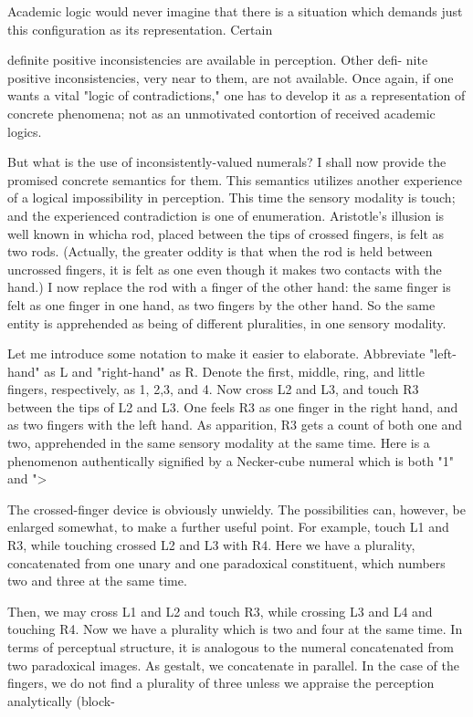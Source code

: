 Academic logic would never imagine that there is a situation 
which demands just this configuration as its representation. Certain 


definite positive inconsistencies are available in perception. Other defi- 
nite positive inconsistencies, very near to them, are not available. Once 
again, if one wants a vital "logic of contradictions," one has to develop 
it as a representation of concrete phenomena; not as an unmotivated 
contortion of received academic logics. 


But what is the use of inconsistently-valued numerals? I shall now 
provide the promised concrete semantics for them. This semantics 
utilizes another experience of a logical impossibility in perception. This 
time the sensory modality is touch; and the experienced contradiction 
is one of enumeration. Aristotle's illusion is well known in whicha rod, 
placed between the tips of crossed fingers, is felt as two rods. (Actually, 
the greater oddity is that when the rod is held between uncrossed 
fingers, it is felt as one even though it makes two contacts with the 
hand.) I now replace the rod with a finger of the other hand: the same 
finger is felt as one finger in one hand, as two fingers by the other hand. 
So the same entity is apprehended as being of different pluralities, in 
one sensory modality. 

Let me introduce some notation to make it easier to elaborate. 
Abbreviate "left-hand" as L and "right-hand" as R. Denote the first, 
middle, ring, and little fingers, respectively, as 1, 2,3, and 4. Now cross 
L2 and L3, and touch R3 between the tips of L2 and L3. One feels R3 as 
one finger in the right hand, and as two fingers with the left hand. As 
apparition, R3 gets a count of both one and two, apprehended in the 
same sensory modality at the same time. Here is a phenomenon 
authentically signified by a Necker-cube numeral which is both "1" and 
"> 

The crossed-finger device is obviously unwieldy. The possibilities 
can, however, be enlarged somewhat, to make a further useful point. 
For example, touch L1 and R3, while touching crossed L2 and L3 with 
R4. Here we have a plurality, concatenated from one unary and one 
paradoxical constituent, which numbers two and three at the same 
time. 

Then, we may cross L1 and L2 and touch R3, while crossing L3 
and L4 and touching R4. Now we have a plurality which is two and 
four at the same time. In terms of perceptual structure, it is analogous 
to the numeral concatenated from two paradoxical images. As gestalt, 
we concatenate in parallel. In the case of the fingers, we do not find a 
plurality of three unless we appraise the perception analytically (block- 


